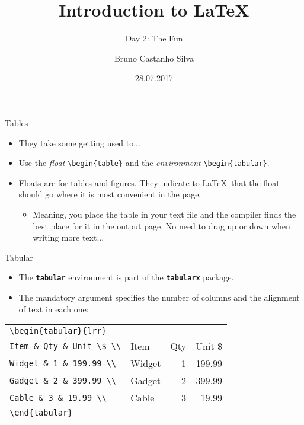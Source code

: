 \documentclass{beamer}
\title{Introduction to \LaTeX}
\author{Bruno Castanho Silva}
\date{28.07.2017}
\subtitle{Day 2: The Fun}
\newcommand{\bftt}[1]{\textbf{\texttt{#1}}}
\newcommand{\cmd}[1]{{\color[HTML]{008000}\bftt{#1}}}
\begin{document}
\begin{frame}
\titlepage
\end{frame}

\begin{frame}[fragile]{Tables}
	\begin{itemize}
		\item They take some getting used to...
		\item Use the \textit{float} \verb|\begin{table}| and the \textit{environment} \verb|\begin{tabular}|.
		\item Floats are for tables and figures. They indicate to \LaTeX~that the float should go where it is most convenient in the page.
		\begin{itemize}
			\item Meaning, you place the table in your text file and the compiler finds the best place for it in the output page. No need to drag up or down when writing more text...
		\end{itemize}
	\end{itemize}
\end{frame}

\begin{frame}[fragile]{Tabular}
	\begin{itemize}
		\item The \cmd{tabular} environment is part of the \cmd{tabularx} package.
		\item The mandatory argument specifies the number of columns and the alignment of text in each one:
	\end{itemize}
	
	\begin{tabular}{l | lrr}
	\verb=\begin{tabular}{lrr}= & & & \\
	\verb=Item & Qty & Unit \$ \\= & Item & Qty & Unit \$ \\
	\verb=Widget & 1 & 199.99 \\= & Widget & 1 & 199.99 \\
	\verb=Gadget & 2 & 399.99 \\= & Gadget & 2 & 399.99 \\ 
	\verb=Cable & 3 & 19.99 \\= & Cable & 3 & 19.99 \\
	\verb|\end{tabular}|
	\end{tabular}
\end{frame}
\end{document}
